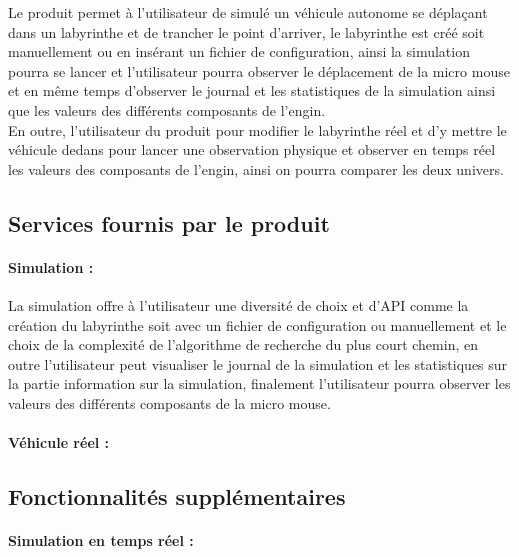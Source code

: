 \vspace{5mm}
Le produit permet à l'utilisateur de simulé un véhicule autonome se 
déplaçant dans un labyrinthe et de trancher le point d'arriver, le 
labyrinthe est créé soit manuellement ou en insérant un fichier de 
configuration, ainsi la simulation pourra se lancer et l'utilisateur 
pourra observer le déplacement de la micro mouse et en même temps d'observer 
le journal et les statistiques de la simulation ainsi que les valeurs des différents 
composants de l'engin. \\

En outre, l'utilisateur du produit pour modifier le labyrinthe réel et d'y mettre le 
véhicule dedans pour lancer une observation physique et observer en temps réel les valeurs 
des composants de l'engin, ainsi on pourra comparer les deux univers.

\subsection{Services fournis par le produit} \label{sec:serLogiciel}

\paragraph{Simulation :}La simulation offre à l'utilisateur une diversité de choix et d'API comme 
la création du labyrinthe soit avec un fichier de configuration ou manuellement 
et le choix de la complexité de l'algorithme de recherche du plus court chemin, 
en outre l'utilisateur peut visualiser le journal de la simulation et les statistiques 
sur la partie information sur la simulation, finalement l'utilisateur pourra observer 
les valeurs des différents composants de la micro mouse. \\



\paragraph{Véhicule réel :}

\subsection{Fonctionnalités supplémentaires} \label{sec:foncSupplementaires}

\paragraph{Simulation en temps réel :}

